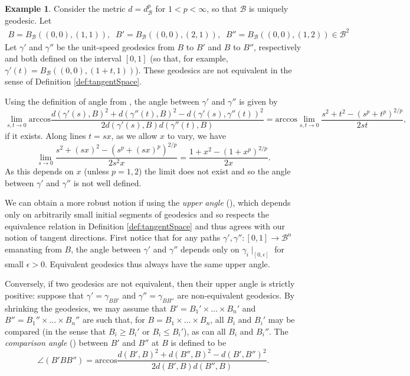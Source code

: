 \documentclass[10pt]{article}
\theoremstyle{definition}
\newtheorem{example}[theorem]{Example}
\begin{document}
\begin{example}
    Consider the metric $d = d_{\mathcal B}^p$ for $1 < p < \infty$, so that 
    $\mathcal B$ is uniquely geodesic. Let 
    \begin{align*}
    B=B_{\mathcal B}((0,0),(1,1)),\;\;
    B'=B_{\mathcal B}((0,0),(2,1)),\;\;
    B''=B_{\mathcal B}((0,0),(1,2)) \in \mathcal B^2
    \end{align*}
    Let $\gamma'$ and $\gamma''$ be the unit-speed geodesics from $B$ to $B'$ and $B$ to $B''$, respectively and both defined on the interval $[0,1]$ (so that, for example, $\gamma'(t) = B_{\mathcal B}((0,0), (1+t,1))$). These geodesics are not equivalent in the sense of Definition \ref{def:tangentSpace}. 
    
    Using the definition of angle from \cite[Definition 3.6.26]{BuragoBuragoIvanov2001}, the angle between $\gamma'$ and $\gamma''$ is given by
    $$
    \lim\limits_{s,t \to 0} \mathrm{arccos}\frac{d(\gamma'(s),B)^2+d(\gamma''(t),B)^2 - d(\gamma'(s),\gamma''(t))^2}{2d(\gamma'(s),B)d(\gamma''(t),B)} = \mathrm{arccos} \lim\limits_{s,t \to 0}\frac{s^2+t^2 - (s^p+t^p)^{2/p}}{2st},
    $$
    if it exists. Along lines $t=sx$, as we allow $x$ to vary, we have 
    $$
    \lim\limits_{s \to 0}\frac{s^2+(sx)^2 - (s^p+(sx)^p)^{2/p}}{2s^2x} = \frac{1+x^2-(1+x^p)^{2/p}}{2x}.
    $$
    As this depends on $x$ (unless $p=1,2$) the limit does not exist and so the angle between $\gamma'$ and $\gamma''$ is not well defined.

    We can obtain a more robust notion if using the \emph{upper angle} (\cite[Definition 3.6.32]{BuragoBuragoIvanov2001}), which depends only on arbitrarily small initial segments of geodesics and so respects the equivalence relation in Definition \ref{def:tangentSpace} and thus agrees with our notion of tangent directions. First notice that for any paths $\gamma', \gamma'': [0,1] \to \mathcal B^n$ emanating from $B$, the angle between $\gamma'$ and $\gamma''$ depends only on $\gamma_i\mid_{[0,\epsilon]}$ for small $\epsilon >0$. Equivalent geodesics thus always have the same upper angle. %
    
    Conversely, if two geodesics are not equivalent, then their upper angle is strictly positive: suppose that $\gamma' = \gamma_{BB'}$ and $\gamma''=\gamma_{BB''}$ are non-equivalent geodesics. By shrinking the geodesics, we may assume that $B' = B_1' \times \dots \times B_n'$ and $B''=B_1'' \times \dots \times B_n''$ are such that, for $B= B_1 \times \dots \times B_n$, all $B_i$ and $B_i'$ may be compared (in the sense that $B_i \geq B_i'$ or $B_i \leq B_i'$), as can all $B_i$ and $B_i''$. The \emph{comparison angle} (\cite[Definition 3.6.25]{BuragoBuragoIvanov2001}) between $B'$ and $B''$ at $B$ is defined to be
    $$\angle(B'BB'') =  \mathrm{arccos}\frac{d(B',B)^2+d(B'',B)^2 - d(B',B'')^2}{2d(B',B)d(B'',B)}.$$
    

\end{example}
\end{document}
